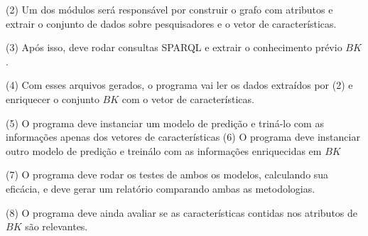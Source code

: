 (2) Um dos módulos será responsável por construir o grafo com atributos e extrair o conjunto de dados sobre pesquisadores e o vetor de características. %

(3) Após isso, deve rodar consultas SPARQL e extrair o conhecimento prévio $BK$.

(4) Com esses arquivos gerados, o programa vai ler os dados extraídos por (2) e enriquecer o conjunto $BK$ com o vetor de características.

(5) O programa deve instanciar um modelo de predição e triná-lo com as informações apenas dos vetores de características
(6) O programa deve instanciar outro modelo de predição e treinálo com as informações enriquecidas em $BK$

(7) O programa deve rodar os testes de ambos os modelos, calculando sua eficácia, e deve gerar um relatório comparando ambas as metodologias.

(8) O programa deve ainda avaliar se as características contidas nos atributos de $BK$ são relevantes.


